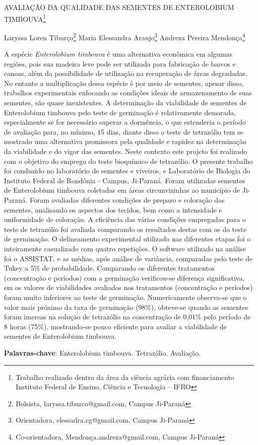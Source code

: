 \documentclass[article,12pt,onesidea,4paper,english,brazil]{abntex2}
\begin{document}
	
	
	\frenchspacing 
	
	\begin{center}
		\LARGE AVALIAÇÃO DA QUALIDADE DAS SEMENTES DE \MakeUppercase{Enterolobium timbouva}\footnote{Trabalho realizado dentro da área da ciência agrária com financiamento Instituto Federal de Ensino,
			Ciência e Tecnologia – IFRO}
		
		\normalsize
		Laryssa Loren Tiburço\footnote{Bolsista, laryssa.tiburco@gmail.com, Campus Ji-Paraná} 
		Maria Elessandra Araujo\footnote{Orientadora, elessadra.cg@gmail.com, Campus Ji-Paraná} 
	Andreza Pereira Mendonça\footnote{Co-orientadora, Mendonça.andreza@gmail.com, Campus Ji-Paraná} 
		 
	\end{center}
	
	\noindent A espécie \textit{Enterolobium timbouva} é uma alternativa econômica em algumas regiões,
	pois sua madeira leve pode ser utilizada para fabricação de barcos e canoas, além
	da possibilidade de utilização na recuperação de áreas degradadas. No entanto a
	multiplicação dessa espécie é por meio de sementes, apesar disso, trabalhos
	experimentais enfocando as condições ideais de armazenamento de suas sementes,
	são quase inexistentes. A determinação da viabilidade de sementes de Enterolobium
	timbouva pelo teste de germinação é relativamente demorada, especialmente se for
	necessário superar a dormência, o que estenderia o período de avaliação para, no
	mínimo, 15 dias, diante disso o teste de tetrazólio tem se mostrado uma alternativa
	promissora pela qualidade e rapidez na determinação da viabilidade e do vigor das
	sementes. Neste contexto este projeto foi realizado com o objetivo do emprego do
	teste bioquímico de tetrazólio. O presente trabalho foi conduzido no laboratório de
	sementes e viveiros, e Laboratório de Biologia do Instituto Federal de Rondônia -
	Campus, Ji-Paraná. Foram utilizadas sementes de Enterolobium timbouva coletadas
	em áreas circunvizinhas ao município de Ji-Paraná. Foram avaliadas diferentes
	condições de preparo e coloração das sementes, analisando os aspectos dos
	tecidos, bem como a intensidade e uniformidade de coloração. A eficiência das
	várias condições empregadas para o teste de tetrazólio foi avaliada comparando os
	resultados destas com os do teste de germinação. O delineamento experimental
	utilizado nas diferentes etapas foi o inteiramente casualizado com quatro repetições.
	O software utilizado na análise foi o ASSISTAT, e as médias, após análise de
	variância, comparadas pelo teste de Tukey a 5\% de probabilidade. Comparando os
	diferentes tratamentos (concentração e períodos) com a germinação verificou-se
	diferença significativa, em os valores de viabilidades avaliados nos tratamentos
	(concentração e períodos) foram muito inferiores ao teste de germinação.
	Numericamente observa-se que o valor mais próximo da taxa de germinação (98\%),
	obteve-se quando as sementes foram imersas na solução de tetrazólio na
	concentração de 0,01\% pelo período de 8 horas (75\%), mostrando-se pouco
	eficiente para avaliar a viabilidade de sementes de Enterolobium timbouva.
	
	\vspace{\onelineskip}
	
	\noindent
	\textbf{Palavras-chave}: Enterolobium timbouva. Tetrazólio. Avaliação.
	
\end{document}
